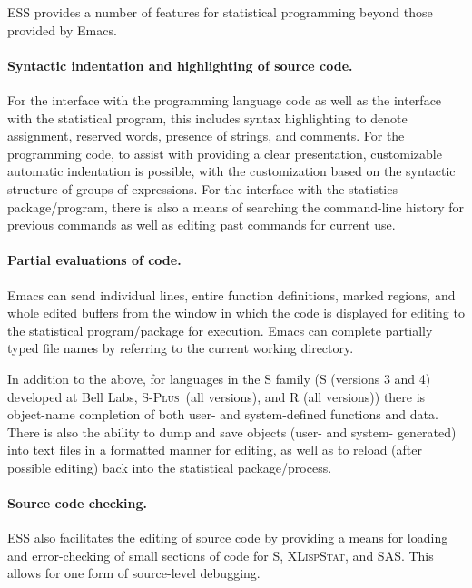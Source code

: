 \documentclass{article}
\newcommand*{\Splus}{\textsc{S-Plus}}
\newcommand*{\XLispStat}{\textsc{XLispStat}}
\begin{document}
ESS provides a number of features for statistical programming beyond
those provided by Emacs.

\paragraph{Syntactic indentation and highlighting of source code.}
For the interface with the programming language code as well as the
interface with the statistical program, this includes syntax
highlighting to denote assignment, reserved words, presence of
strings, and comments.
For the programming code, to assist with providing a clear
presentation, customizable automatic indentation is possible, with the
customization based on the syntactic structure of groups of
expressions.  For the interface with the statistics package/program,
there is also a means of searching the command-line history for
previous commands as well as editing past commands for current use.

\paragraph{Partial evaluations of code.}
Emacs can send individual lines, entire function definitions, marked
regions, and whole edited buffers from the window in which the code is
displayed for editing to the statistical program/package for
execution.  Emacs can complete partially typed file
names by referring to the current working directory.

In addition to the above, for languages in the S family (S (versions 3
and 4) developed at Bell Labs, \Splus\ (all versions), and R (all
versions)) there is object-name completion of both user- and
system-defined functions and data.  There is also the ability to dump
and save objects (user- and system- generated) into text files in a
formatted manner for editing, as well as to reload (after possible
editing) back into the statistical package/process.

\paragraph{Source code checking.}
ESS also facilitates the editing of source code by providing a means
for loading and error-checking of small sections of code for S,
\XLispStat, and SAS.  This allows for one form of source-level
debugging.
\end{document}

